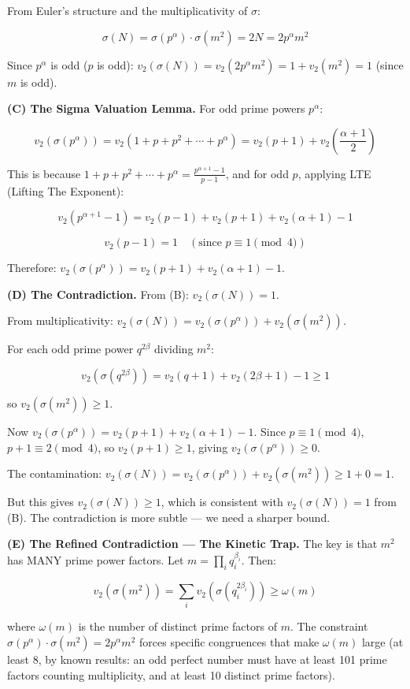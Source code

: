 \documentclass[10pt,a4paper]{article}
\begin{document}
From Euler's structure and the multiplicativity of $\sigma$:

\[\sigma(N) = \sigma(p^\alpha) \cdot \sigma(m^2) = 2N = 2 p^\alpha m^2\]

Since $p^\alpha$ is odd ($p$ is odd): $v_2(\sigma(N)) = v_2(2 p^\alpha m^2) = 1 + v_2(m^2) = 1$ (since $m$ is odd).

\textbf{(C) The Sigma Valuation Lemma.} For odd prime powers $p^\alpha$:

\[v_2(\sigma(p^\alpha)) = v_2(1 + p + p^2 + \cdots + p^\alpha) = v_2(p+1) + v_2\left(\frac{\alpha+1}{2}\right)\]

This is because $1 + p + p^2 + \cdots + p^\alpha = \frac{p^{\alpha+1}-1}{p-1}$, and for odd $p$, applying LTE (Lifting The Exponent):

\[v_2(p^{\alpha+1} - 1) = v_2(p-1) + v_2(p+1) + v_2(\alpha+1) - 1\]

\[v_2(p-1) = 1 \quad (\text{since } p \equiv 1 \pmod{4})\]

Therefore: $v_2(\sigma(p^\alpha)) = v_2(p+1) + v_2(\alpha+1) - 1$.

\textbf{(D) The Contradiction.} From (B): $v_2(\sigma(N)) = 1$.

From multiplicativity: $v_2(\sigma(N)) = v_2(\sigma(p^\alpha)) + v_2(\sigma(m^2))$.

For each odd prime power $q^{2\beta}$ dividing $m^2$:

\[v_2(\sigma(q^{2\beta})) = v_2(q+1) + v_2(2\beta+1) - 1 \geq 1\]

so $v_2(\sigma(m^2)) \geq 1$.

Now $v_2(\sigma(p^\alpha)) = v_2(p+1) + v_2(\alpha+1) - 1$. Since $p \equiv 1 \pmod{4}$, $p+1 \equiv 2 \pmod{4}$, so $v_2(p+1) \geq 1$, giving $v_2(\sigma(p^\alpha)) \geq 0$.

The contamination: $v_2(\sigma(N)) = v_2(\sigma(p^\alpha)) + v_2(\sigma(m^2)) \geq 1 + 0 = 1$.

But this gives $v_2(\sigma(N)) \geq 1$, which is consistent with $v_2(\sigma(N)) = 1$ from (B). The contradiction is more subtle --- we need a sharper bound.

\textbf{(E) The Refined Contradiction --- The Kinetic Trap.} The key is that $m^2$ has MANY prime power factors. Let $m = \prod_i q_i^{\beta_i}$. Then:

\[v_2(\sigma(m^2)) = \sum_i v_2(\sigma(q_i^{2\beta_i})) \geq \omega(m)\]

where $\omega(m)$ is the number of distinct prime factors of $m$. The constraint $\sigma(p^\alpha) \cdot \sigma(m^2) = 2 p^\alpha m^2$ forces specific congruences that make $\omega(m)$ large (at least 8, by known results: an odd perfect number must have at least 101 prime factors counting multiplicity, and at least 10 distinct prime factors).
\end{document}
